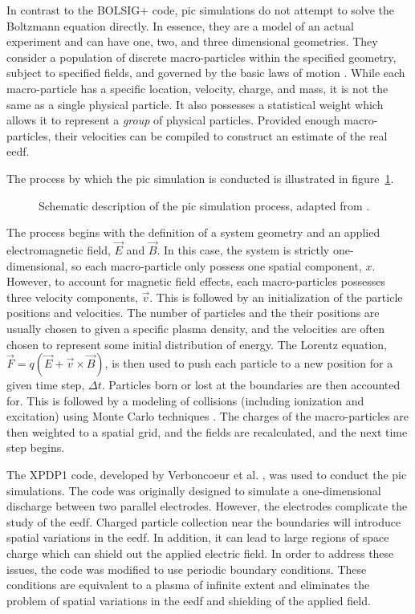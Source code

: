 In contrast to the BOLSIG+ code, \acs{pic} simulations do not attempt to solve
the Boltzmann equation directly. In essence, they are a model of an actual
experiment and can have one, two, and three dimensional geometries. They
consider a population of discrete macro-particles within the specified geometry,
subject to specified fields, and governed by the basic laws of motion
\cite{Birdsall1991}. While each macro-particle has a specific location,
velocity, charge, and mass, it is not the same as a single physical particle. It
also possesses a statistical weight which allows it to represent a \emph{group}
of physical particles. Provided enough macro-particles, their velocities can be
compiled to construct an estimate of the real \acs{eedf}.

The process by which the \acs{pic} simulation is conducted is illustrated in
figure~\ref{fig:pic}.
\begin{figure}
  \centering
  
  \caption{Schematic description of the \acs{pic} simulation process, adapted
    from \cite{Birdsall1991}.}
  \label{fig:pic}
\end{figure}
The process begins with the definition of a system geometry and an applied
electromagnetic field, $\vec{E}$ and $\vec{B}$. In this case, the system is
strictly one-dimensional, so each macro-particle only possess one spatial
component, $x$. However, to account for magnetic field effects, each
macro-particles possesses three velocity components, $\vec{v}$. This is followed
by an initialization of the particle positions and velocities. The number of
particles and the their positions are usually chosen to given a specific plasma
density, and the velocities are often chosen to represent some initial
distribution of energy. The Lorentz equation, $\vec{F} = q(\vec{E} +
\vec{v}\times\vec{B})$, is then used to push each particle to a new position for
a given time step, $\Delta t$. Particles born or lost at the boundaries are then
accounted for. This is followed by a modeling of collisions (including
ionization and excitation) using Monte Carlo techniques \cite{Birdsall1991}. The
charges of the macro-particles are then weighted to a spatial grid, and the
fields are recalculated, and the next time step begins.

The XPDP1 code, developed by Verboncoeur et al. \cite{Verboncoeur1993}, was used
to conduct the \acs{pic} simulations. The code was originally designed to
simulate a one-dimensional discharge between two parallel electrodes. However,
the electrodes complicate the study of the \acs{eedf}. Charged particle
collection near the boundaries will introduce spatial variations in the
\acs{eedf}. In addition, it can lead to large regions of space charge which can
shield out the applied electric field. In order to address these issues, the
code was modified to use periodic boundary conditions. These conditions are
equivalent to a plasma of infinite extent and eliminates the problem of spatial
variations in the \acs{eedf} and shielding of the applied field.

